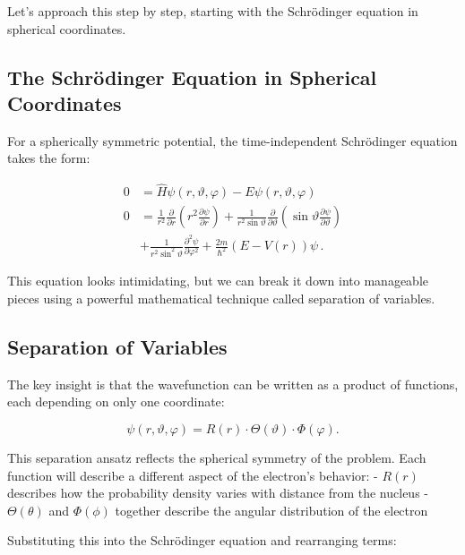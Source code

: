 \documentclass[
  a4paper,
]{book}
\begin{document}
Let's approach this step by step, starting with the Schrödinger equation
in spherical coordinates.

\subsection{The Schrödinger Equation in Spherical
Coordinates}\label{the-schruxf6dinger-equation-in-spherical-coordinates}

For a spherically symmetric potential, the time-independent Schrödinger
equation takes the form:

\[
\begin{aligned}
0 & =  \hat{H} \psi \left( r,\vartheta,\varphi \right) - E \psi \left( r,\vartheta,\varphi \right)\\[1mm]
0 & =  \frac{1}{r^2} \frac{\partial}{\partial r} \left( r^2 \frac{\partial \psi}{\partial r} \right)
+ \frac{1}{r^2 \sin \vartheta} \frac{\partial}{\partial \vartheta}
\left( \sin \vartheta \frac{\partial \psi}{\partial \vartheta} \right) \\[1mm]
&  + \frac{1}{r^2 \sin^2 \vartheta} \frac{\partial^2 \psi}{\partial \varphi^2}
+ \frac{2m}{\hbar^2} \left( E - V\left( r \right) \right) \psi \,.
\end{aligned}
\]

This equation looks intimidating, but we can break it down into
manageable pieces using a powerful mathematical technique called
separation of variables.

\subsection{Separation of Variables}\label{separation-of-variables}

The key insight is that the wavefunction can be written as a product of
functions, each depending on only one coordinate:

\[
\psi \left( r,\vartheta,\varphi \right) = R \left( r \right) \cdot \Theta \left(\vartheta\right) \cdot \Phi \left(\varphi \right) \mathrm{.}
\]

This separation ansatz reflects the spherical symmetry of the problem.
Each function will describe a different aspect of the electron's
behavior: - \(R(r)\) describes how the probability density varies with
distance from the nucleus - \(\Theta(\theta)\) and \(\Phi(\phi)\)
together describe the angular distribution of the electron

Substituting this into the Schrödinger equation and rearranging terms:
\end{document}
